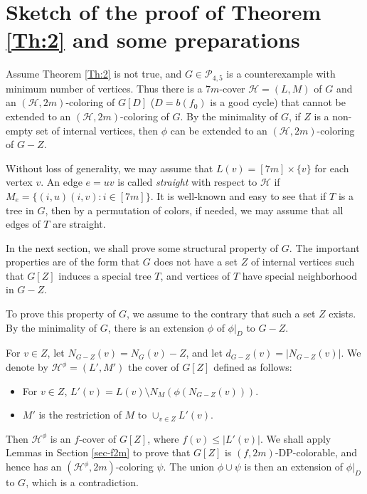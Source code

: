 \documentclass{article}
\begin{document}
\section{Sketch of the proof of Theorem \ref{Th:2} and some preparations}
\label{sec-preparation}


  Assume Theorem \ref{Th:2} is not true, and $G \in \mathcal{P}_{4,5}$ is a counterexample with minimum number of vertices. Thus there is a  $7m$-cover $\mathcal{H}=(L,M)$    of $G$  and  an 
$(\mathcal{H}, 2m)$-coloring of $G[D]$ ($D=b(f_0)$ is a good cycle)  that cannot  be extended to an   $(\mathcal{H}, 2m)$-coloring of $G$.  By the minimality of $G$, if $Z$ is a non-empty  set of internal vertices, then $\phi$ can be extended to an $(\mathcal{H}, 2m)$-coloring of $G-Z$. 

Without loss of generality, we may assume that $L(v) = [7m] \times \{v\}$ for each vertex $v$. An edge $e=uv$ is called  \textit{straight} with respect to $\mathcal{H}$ if 
$M_e= \{(i,u)(i,v): i \in [7m]\}$. It is well-known \cite{dvovrak2018correspondence} and easy to see that if $T$ is a tree in $G$, then by a permutation of colors, if needed, we may assume that all edges of $T$ are straight. 

In the next  section, we shall prove some structural property of $G$. The important properties are of the form that $G$ does not have a set $Z$ of internal vertices such that $G[Z]$ induces a special tree $T$, and vertices of $T$ have special neighborhood in $G-Z$.  

To prove this property of $G$, we assume to the contrary that such a set $Z$ exists. 
By the minimality of $G$, there is   an extension $\phi$ of $\phi|_D$ to $G-Z$.

For $v \in Z$, let
$N_{G-Z}(v) = N_G(v) -Z$, and let $d_{G-Z}(v)=|N_{G-Z}(v)|$. 
We denote by $\mathcal{H}^{\phi} = (L', M')$ the cover of $G[Z]$ defined as follows: 
\begin{itemize}
  \item   For $v \in Z$, $L'(v)=L(v) \setminus N_M(\phi(N_{G-Z}(v)))$. 
  \item $M'$ is the restriction of $M$ to $\cup_{v \in Z}L'(v)$.
\end{itemize}

Then $\mathcal{H}^{\phi}$ is an $f$-cover of $G[Z]$, where $f(v) \le  |L'(v)|$. We shall apply   Lemmas in Section \ref{sec-f2m} to prove that $G[Z]$ is $(f, 2m)$-DP-colorable, and hence has an $(\mathcal{H}^{\phi}, 2m)$-coloring $\psi$. The union $\phi \cup \psi$ is then an extension of $\phi|_D$ to $G$, which is a contradiction. 
\end{document}
